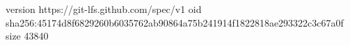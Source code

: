 version https://git-lfs.github.com/spec/v1
oid sha256:45174d8f6829260b6035762ab90864a75b241914f1822818ae293322c3c67a0f
size 43840
